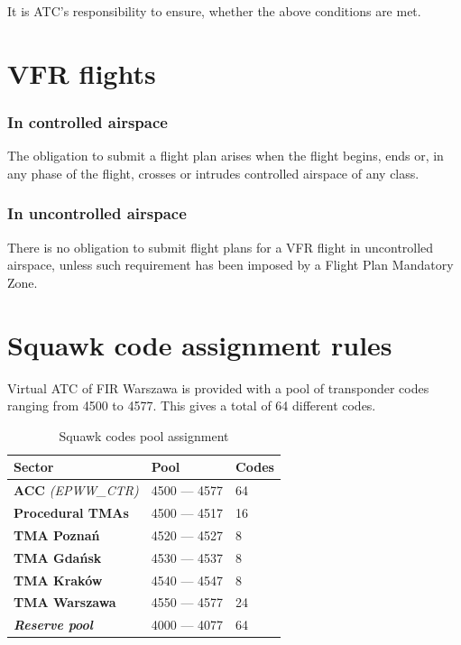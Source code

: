 It is ATC's responsibility to ensure, whether the above conditions are met.

\section{VFR flights}%

\subsubsection{In controlled airspace}
The obligation to submit a flight plan arises when the flight begins, ends or, in any phase of the flight, crosses or intrudes controlled airspace of any class.

\subsubsection{In uncontrolled airspace}
There is no obligation to submit flight plans for a VFR flight in uncontrolled airspace, unless such requirement has been imposed by a Flight Plan Mandatory Zone.

\section{Squawk code assignment rules}%
\label{sect:airspace:squawks}

Virtual ATC of FIR Warszawa is provided with a pool of transponder codes ranging from 4500 to 4577. This gives a total of 64 different codes.

\begin{table}[htbp]
	\centering
	\begin{tabular}{|l|l|l|}
		\rowcolor{vred}
		\color{white}\textbf Sector       & \color{white}\textbf Pool & \color{white}\textbf Codes \\\hline
		\textbf{ACC} \textit{(EPWW\_CTR)} & 4500 --- 4577             & 64                         \\\hline
		\textbf{Procedural TMAs}          & 4500 --- 4517             & 16                         \\\hline
		\textbf{TMA Poznań}               & 4520 --- 4527             & 8                          \\\hline
		\textbf{TMA Gdańsk}               & 4530 --- 4537             & 8                          \\\hline
		\textbf{TMA Kraków}               & 4540 --- 4547             & 8                          \\\hline
		\textbf{TMA Warszawa}             & 4550 --- 4577             & 24                         \\\hline
		\textit{\textbf{Reserve pool}}    & 4000 --- 4077             & 64                         \\\hline
	\end{tabular}
	\caption{Squawk codes pool assignment}
	\label{tbl:squawk}
\end{table}

